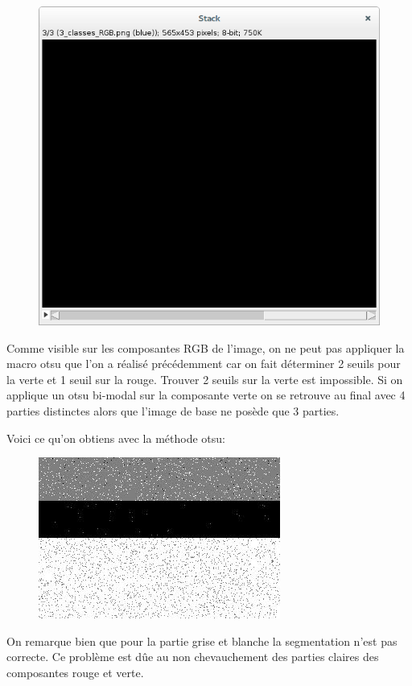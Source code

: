 \documentclass[a4paper,12pt]{report}
\begin{document}
\begin{figure}[!ht]
	\includegraphics[scale=0.25]{image/stack-3.png}
\end{figure} 

Comme visible sur les composantes RGB de l'image, on ne peut pas appliquer la macro otsu que l'on a réalisé précédemment car on fait déterminer 2 seuils pour la verte et 1 seuil sur la rouge. Trouver 2 seuils sur la verte est impossible. Si on applique un otsu bi-modal sur la composante verte on se retrouve au final avec 4 parties distinctes alors que l'image de base ne posède que 3 parties.

Voici ce qu'on obtiens avec la méthode otsu:

\begin{figure}[!ht]
	\center	
	\includegraphics[scale=1]{image/probleme.jpg}
\end{figure} 

On remarque bien que pour la partie grise et blanche la segmentation n'est pas correcte. Ce problème est dûe au non chevauchement des parties claires des composantes rouge et verte.
\end{document}
